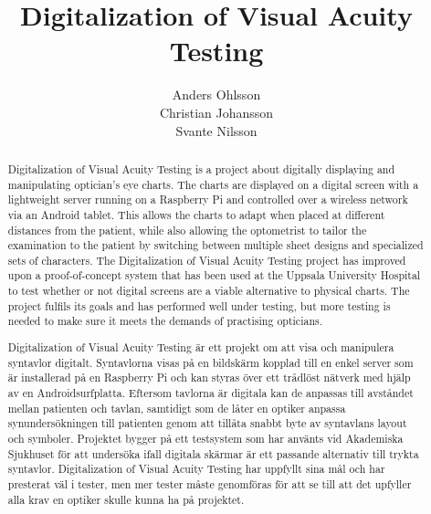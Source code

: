 \documentclass[12pt,a4paper,notitlepage]{report}
\begin{document}

\title{Digitalization of Visual Acuity Testing}
\author{Anders Ohlsson\\Christian Johansson\\Svante Nilsson}
\maketitle

\begin{abstract}
Digitalization of Visual Acuity Testing is a project about digitally displaying and manipulating optician's eye charts. The charts are displayed on a digital screen with a lightweight server running on a Raspberry Pi and controlled over a wireless network via an Android tablet. 
This allows the charts to adapt when placed at different distances from the patient, while also allowing the optometrist to tailor the examination to the patient by switching between multiple sheet designs and specialized sets of characters. 
The Digitalization of Visual Acuity Testing project has improved upon a proof-of-concept system that has been used at the Uppsala University Hospital to test whether or not digital screens are a viable alternative to physical charts. The project fulfils its goals and has performed well under testing, but more testing is needed to make sure it meets the demands of practising opticians.
\end{abstract}
\renewcommand{\abstractname}{Sammanfattning}
\begin{abstract}
Digitalization of Visual Acuity Testing är ett projekt om att visa och manipulera syntavlor digitalt. Syntavlorna visas på en bildskärm kopplad till en enkel server som är installerad på en Raspberry Pi och kan styras över ett trådlöst nätverk med hjälp av en Androidsurfplatta. Eftersom tavlorna är digitala kan de anpassas till avståndet mellan patienten och tavlan, samtidigt som de låter en optiker anpassa synundersökningen till patienten genom att tillåta snabbt byte av syntavlans layout och symboler. Projektet bygger på ett testsystem som har använts vid Akademiska Sjukhuset för att undersöka ifall digitala skärmar är ett passande alternativ till trykta syntavlor. Digitalization of Visual Acuity Testing har uppfyllt sina mål och har presterat väl i tester, men mer tester måste genomföras för att se till att det upfyller alla krav en optiker skulle kunna ha på projektet.
\end{abstract}
\renewcommand\thechapter{ }
\tableofcontents*
\listoffigures
\clearpage
\end{document}
